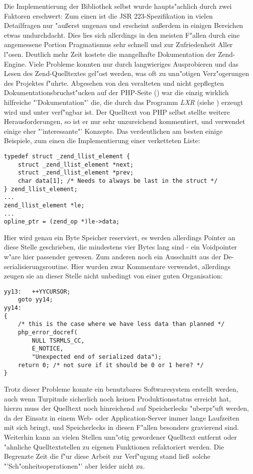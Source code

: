 Die Implementierung der Bibliothek selbst wurde haupts"achlich durch zwei Faktoren erschwert:
Zum einen ist die JSR 223-Spezifikation in vielen Detailfragen nur "au\ss erst ungenau und erscheint au\ss erdem
in einigen Bereichen etwas undurchdacht. Dies lies sich allerdings in den meisten F"allen durch eine
angemessene Portion Pragmatismus sehr schnell und zur Zufriedenheit Aller l"osen. Deutlich mehr Zeit
kostete die mangelhafte Dokumentation der Zend-Engine. Viele Probleme konnten nur durch langwieriges
Ausprobieren und das Lesen des Zend-Quelltextes gel"ost werden, was oft zu unn"otigen Verz"ogerungen 
des Projektes f"uhrte. Abgesehen von den veralteten und nicht gepflegten Dokumentationsbruchst"ucken
auf der PHP-Seite (\cite{PHPHP}) war die einzig wirklich hilfreiche "'Dokumentation"' die, die durch das Programm
\emph{LXR} (siehe \cite{LXRHP}) erzeugt wird und unter \cite{PHPLXR} verf"ugbar ist. Der Quelltext
von PHP selbst stellte weitere Herausforderungen, so ist er nur sehr unzureichend kommentiert, und verwendet
einige eher "'interessante"' Konzepte. Das verdeutlichen am besten einige Beispiele, zum einen die 
Implementierung einer verketteten Liste:

\begin{lstlisting}[caption=Verkettete Liste im Zend-Code]
typedef struct _zend_llist_element {
    struct _zend_llist_element *next;
    struct _zend_llist_element *prev;
    char data[1]; /* Needs to always be last in the struct */
} zend_llist_element;
...
zend_llist_element *le;
...
opline_ptr = (zend_op *)le->data;
\end{lstlisting}

Hier wird genau ein Byte Speicher reserviert, es werden allerdings Pointer an diese Stelle geschrieben,
die mindestens vier Bytes lang sind - ein Voidpointer w"are hier passender gewesen.
Zum anderen noch ein Ausschnitt aus der De-serialisierungsroutine. Hier wurden zwar Kommentare
verwendet, allerdings zeugen sie an dieser Stelle nicht unbedingt von einer guten Organisation:

\begin{lstlisting}[caption=Zend-Engine: De-serialisierung]
yy13:   ++YYCURSOR;
    goto yy14;
yy14:
{
    /* this is the case where we have less data than planned */
    php_error_docref(
        NULL TSRMLS_CC, 
        E_NOTICE, 
        "Unexpected end of serialized data");
    return 0; /* not sure if it should be 0 or 1 here? */
}
\end{lstlisting}

Trotz dieser Probleme konnte ein benutzbares Softwaresystem erstellt werden, auch wenn Turpitude sicherlich
noch keinen Produktionsstatus erreicht hat, hierzu muss der Quelltext noch hinreichend auf Speicherlecks
"uberpr"uft werden, da der Einsatz in einem Web- oder Application-Server immer lange Laufzeiten mit sich bringt,
und Speicherlecks in diesen F"allen besonders gravierend sind. Weiterhin kann an vielen Stellen unn"otig gewordener
Quelltext entfernt oder "ahnliche Quelltextstellen zu eigenen Funktionen refaktoriert werden. Die Begrenzte Zeit
die f"ur diese Arbeit zur Verf"ugung stand lie\ss\ solche "'Sch"onheitsoperationen"' aber leider nicht zu.

